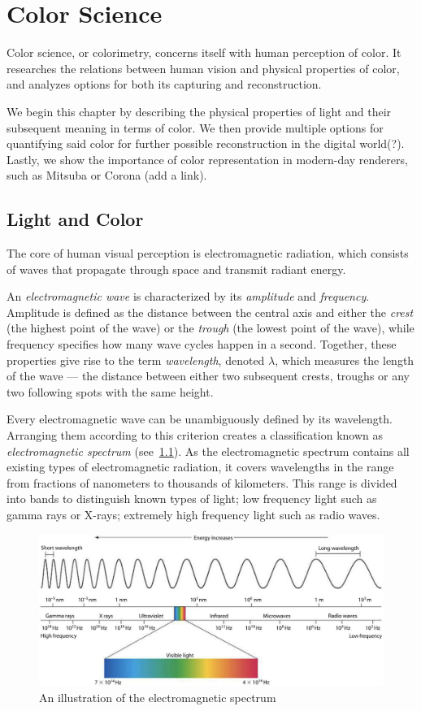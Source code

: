 \chapter{Color Science}

Color science, or colorimetry, concerns itself with human perception of color. It researches the relations between human vision and physical properties of color, and analyzes options for both its capturing and reconstruction.

We begin this chapter by describing the physical properties of light and their subsequent meaning in terms of color. We then provide multiple options for quantifying said color for further possible reconstruction in the digital world(?). Lastly, we show the importance of color representation in modern-day renderers, such as Mitsuba or Corona (add a link).

\section{Light and Color}

The core of human visual perception is electromagnetic radiation, which consists of waves that propagate through space and transmit radiant energy.

An \emph{electromagnetic wave} is characterized by its \emph{amplitude} and \emph{frequency}. Amplitude is defined as the distance between the central axis and either the \emph{crest} (the highest point of the wave) or the \emph{trough} (the lowest point of the wave), while frequency specifies how many wave cycles happen in a second. Together, these properties give rise to the term \emph{wavelength}, denoted $\lambda$, which measures the length of the wave --- the distance between either two subsequent crests, troughs or any two following spots with the same height. 

Every electromagnetic wave can be unambiguously defined by its wavelength. Arranging them according to this criterion creates a classification known as \emph{electromagnetic spectrum} (see~\cref{fig:electromagneticSpectrum}). As the electromagnetic spectrum contains all existing types of electromagnetic radiation, it covers wavelengths in the range from fractions of nanometers to thousands of kilometers. This range is divided into bands to distinguish known types of light; low frequency light such as gamma rays or X-rays; extremely high frequency light such as radio waves.

\begin{figure}[t]
	\centering
	\includegraphics[width=0.8\linewidth]{img/electromagnetic_spectrum.png}
	\caption{An illustration of the electromagnetic spectrum~\cite{electromagneticSpectrum}} \label{fig:electromagneticSpectrum}
\end{figure}

